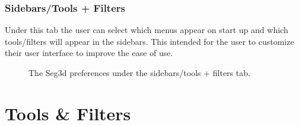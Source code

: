 \documentclass[fleqn,11pt,openany]{book}
\begin{document}
\subsection{Sidebars/Tools + Filters}
Under this tab the user can select which menus appear on start up and which tools/filters will appear in the 
sidebars.  This intended for the user to customize their user interface to improve the ease of use.

\begin{figure}[h!]
\caption{The Seg3d preferences under the sidebars/tools + filters tab.}\label{fig:Pref_side}
\end{figure}






\chapter{Tools \& Filters}
\label{sec:tools_filters}
\end{document}

